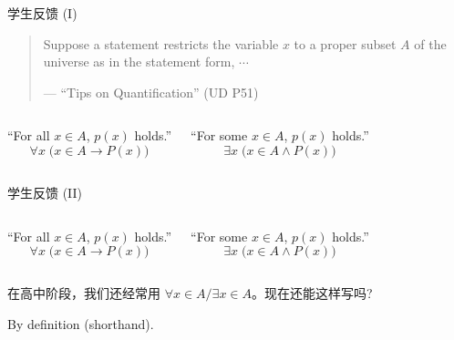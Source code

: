 \begin{frame}{学生反馈 (I)}
  \begin{quote}
    Suppose a statement restricts the variable $x$ to a proper subset $A$
    of the universe as in the statement form, $\cdots$

    \hfill --- ``Tips on Quantification'' (UD P51)
  \end{quote}
  
  \vspace{0.60cm}
  \begin{columns}
      ``For all $x \in A$, $p(x)$ holds.''
      \[
	\forall x \; \Big(x \in A \to P(x)\Big)
      \]

      ``For some $x \in A$, $p(x)$ holds.''
      \[
	\exists x \; \Big(x \in A \land P(x)\Big)
      \]

  \end{columns}

  \vspace{0.30cm}
  \centerline{}
\end{frame}

\begin{frame}{学生反馈 (II)}
  \begin{columns}
      ``For all $x \in A$, $p(x)$ holds.''
      \[
	\forall x \; \Big(x \in A \to P(x)\Big)
      \]

      ``For some $x \in A$, $p(x)$ holds.''
      \[
	\exists x \; \Big(x \in A \land P(x)\Big)
      \]

  \end{columns}

  \vspace{0.30cm}
  \centerline{ 在高中阶段，我们还经常用 $\forall x \in A/\exists x \in A$。现在还能这样写吗?}

  \pause
  \vspace{0.60cm}
  \centerline{By definition (shorthand).}
\end{frame}

